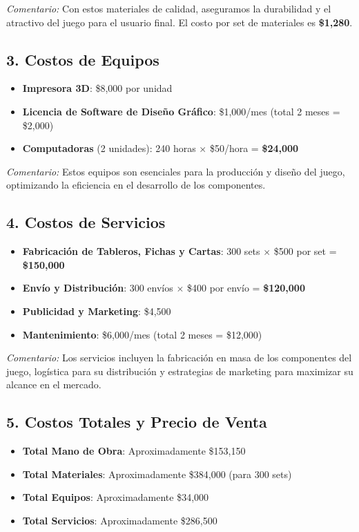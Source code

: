 \documentclass[12pt]{article}
\begin{document}
\textit{Comentario:} Con estos materiales de calidad, aseguramos la durabilidad y el atractivo del juego para el usuario final. El costo por set de materiales es \textbf{\$1,280}.

\subsection*{3. Costos de Equipos}
\begin{itemize}
    \item \textbf{Impresora 3D}: \$8,000 por unidad
    \item \textbf{Licencia de Software de Diseño Gráfico}: \$1,000/mes (total 2 meses = \$2,000)
    \item \textbf{Computadoras} (2 unidades): 240 horas $\times$ \$50/hora = \textbf{\$24,000}
\end{itemize}

\textit{Comentario:} Estos equipos son esenciales para la producción y diseño del juego, optimizando la eficiencia en el desarrollo de los componentes.

\subsection*{4. Costos de Servicios}
\begin{itemize}
    \item \textbf{Fabricación de Tableros, Fichas y Cartas}: 300 sets $\times$ \$500 por set = \textbf{\$150,000}
    \item \textbf{Envío y Distribución}: 300 envíos $\times$ \$400 por envío = \textbf{\$120,000}
    \item \textbf{Publicidad y Marketing}: \$4,500
    \item \textbf{Mantenimiento}: \$6,000/mes (total 2 meses = \$12,000)
\end{itemize}

\textit{Comentario:} Los servicios incluyen la fabricación en masa de los componentes del juego, logística para su distribución y estrategias de marketing para maximizar su alcance en el mercado.

\subsection*{5. Costos Totales y Precio de Venta}
\begin{itemize}
    \item \textbf{Total Mano de Obra}: Aproximadamente \$153,150
    \item \textbf{Total Materiales}: Aproximadamente \$384,000 (para 300 sets)
    \item \textbf{Total Equipos}: Aproximadamente \$34,000
    \item \textbf{Total Servicios}: Aproximadamente \$286,500
\end{itemize}
\end{document}
